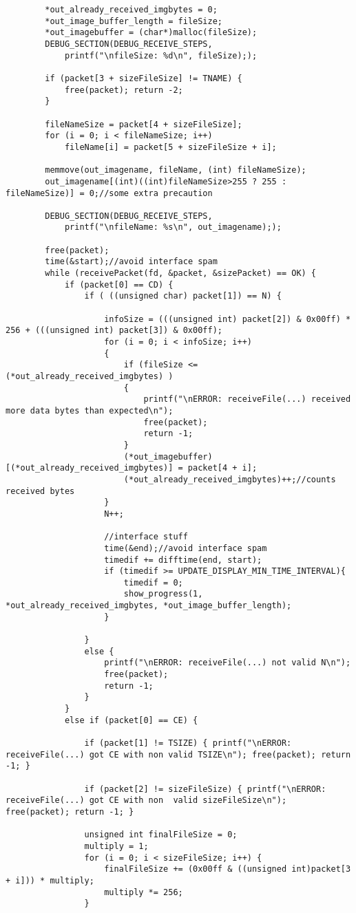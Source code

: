 \begin{lstlisting}
		*out_already_received_imgbytes = 0;
		*out_image_buffer_length = fileSize;
		*out_imagebuffer = (char*)malloc(fileSize);
		DEBUG_SECTION(DEBUG_RECEIVE_STEPS,
			printf("\nfileSize: %d\n", fileSize););

		if (packet[3 + sizeFileSize] != TNAME) {
			free(packet); return -2;
		}

		fileNameSize = packet[4 + sizeFileSize];
		for (i = 0; i < fileNameSize; i++)
			fileName[i] = packet[5 + sizeFileSize + i];

		memmove(out_imagename, fileName, (int) fileNameSize);
		out_imagename[(int)((int)fileNameSize>255 ? 255 : fileNameSize)] = 0;//some extra precaution

		DEBUG_SECTION(DEBUG_RECEIVE_STEPS,
			printf("\nfileName: %s\n", out_imagename););

		free(packet);
		time(&start);//avoid interface spam
		while (receivePacket(fd, &packet, &sizePacket) == OK) {
			if (packet[0] == CD) {
				if ( ((unsigned char) packet[1]) == N) {

					infoSize = (((unsigned int) packet[2]) & 0x00ff) * 256 + (((unsigned int) packet[3]) & 0x00ff);
					for (i = 0; i < infoSize; i++)
					{
						if (fileSize <= (*out_already_received_imgbytes) )
						{
							printf("\nERROR: receiveFile(...) received more data bytes than expected\n");
							free(packet);
							return -1;
						}
						(*out_imagebuffer)[(*out_already_received_imgbytes)] = packet[4 + i];
						(*out_already_received_imgbytes)++;//counts received bytes
					}
					N++;

					//interface stuff
					time(&end);//avoid interface spam
					timedif += difftime(end, start);
					if (timedif >= UPDATE_DISPLAY_MIN_TIME_INTERVAL){
						timedif = 0;
						show_progress(1, *out_already_received_imgbytes, *out_image_buffer_length);
					}

				}
				else {
					printf("\nERROR: receiveFile(...) not valid N\n");
					free(packet);
					return -1;
				}
			}
			else if (packet[0] == CE) {

				if (packet[1] != TSIZE) { printf("\nERROR: receiveFile(...) got CE with non valid TSIZE\n"); free(packet); return -1; }

				if (packet[2] != sizeFileSize) { printf("\nERROR: receiveFile(...) got CE with non  valid sizeFileSize\n"); free(packet); return -1; }

				unsigned int finalFileSize = 0;
				multiply = 1;
				for (i = 0; i < sizeFileSize; i++) {
					finalFileSize += (0x00ff & ((unsigned int)packet[3 + i])) * multiply;
					multiply *= 256;
				}


\end{lstlisting}
